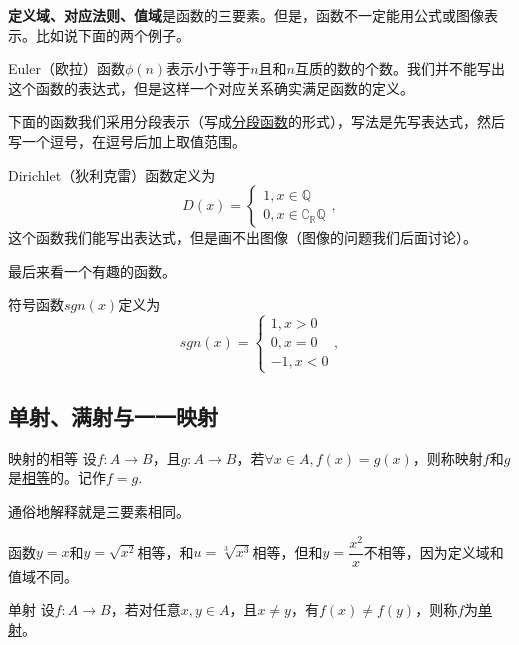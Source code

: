 \documentclass[lang=cn,math=cm,chinesefont=nofont,11pt,scheme=chinese,onecol]{elegantbook}
\begin{document}
\begin{spacing}{2.0}
  \textbf{定义域、对应法则、值域}是函数的三要素。但是，函数不一定能用公式或图像表示。比如说下面的两个例子。
\end{spacing}

\begin{example}
  Euler（欧拉）函数$\phi (n)$表示小于等于$n$且和$n$互质的数的个数。我们并不能写出这个函数的表达式，但是这样一个对应关系确实满足函数的定义。
\end{example}

下面的函数我们采用分段表示（写成\underline{分段函数}的形式），写法是先写表达式，然后写一个逗号，在逗号后加上取值范围。

\begin{example}
  Dirichlet（狄利克雷）函数定义为
  $$D(x)=
  \begin{cases}
    1,x\in\mathbb{Q}
    \\0,x\in\complement_{\mathbb{R}}\mathbb{Q}
  \end{cases},$$
  这个函数我们能写出表达式，但是画不出图像（图像的问题我们后面讨论）。
\end{example}

最后来看一个有趣的函数。

\begin{example}
  符号函数$sgn(x)$定义为
  $$sgn(x)=
  \begin{cases}
    1,x>0
    \\0,x=0
    \\-1,x<0
  \end{cases},$$
\end{example}

\subsection{单射、满射与一一映射}

\begin{definition}{映射的相等}
  设$f:A\rightarrow B$，且$g:A\rightarrow B$，若$\forall x\in A,f(x)=g(x)$，则称映射$f$和$g$是\underline{相等}的。记作$f=g$.
\end{definition}

通俗地解释就是三要素相同。

\begin{example}
  函数$y=x$和$y=\sqrt{x^2}$相等，和$u=\sqrt[3]{x^3}$相等，但和$y=\dfrac{x^2}{x}$不相等，因为定义域和值域不同。
\end{example}

\begin{definition}{单射}
  设$f:A\rightarrow B$，若对任意$x,y\in A$，且$x\neq y$，有$f(x)\neq f(y)$，则称$f$为\underline{单射}。
\end{definition}
\end{document}
